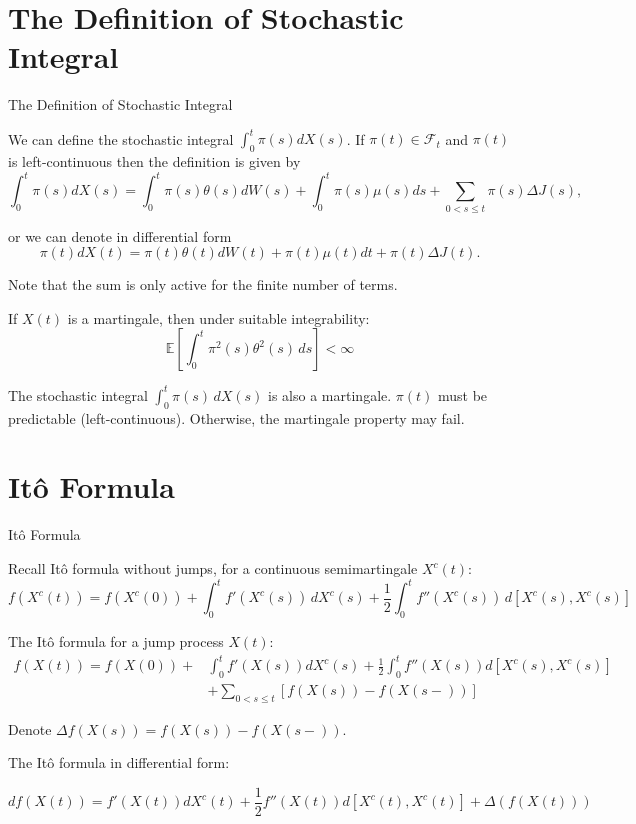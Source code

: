 \documentclass{beamer}
\begin{document}
\section{The Definition of Stochastic Integral}
\begin{frame}{The Definition of Stochastic Integral}

    {\footnotesize \footnotesize
    \par We can define the stochastic integral \(\int_0^t \pi(s) dX(s)\). If \(\pi(t) \in \mathcal{F}_t\) and \(\pi(t)\) is left-continuous then the definition is given by
    \[
    \int_0^t \pi(s) dX(s) = \int_0^t \pi(s) \theta(s) dW(s) + \int_0^t \pi(s) \mu(s) ds + \sum_{0 < s \leq t} \pi(s) \Delta J(s),
    \]
    \par or we can denote in differential form
    \[
    \pi(t) dX(t) = \pi(t) \theta(t) dW(t) + \pi(t) \mu(t) dt + \pi(t) \Delta J(t).
    \]

    \par Note that the sum is only active for the finite number of terms.
    \vspace{1em}
    \par If \( X(t) \) is a martingale, then under suitable integrability:
    \[
    \mathbb{E} \left[ \int_{0}^{t} \pi^2(s) \theta^2(s) \, ds \right] < \infty
    \]
    \par The stochastic integral \(\int_{0}^{t} \pi(s) \, dX(s)\) is also a martingale. \( \pi(t) \) 
    must be predictable (left-continuous). Otherwise, the martingale property may fail.

    }
    
\end{frame}

\section{Itô Formula}
 \begin{frame}{Itô Formula}

    {\footnotesize \footnotesize
    \par Recall Itô formula without jumps, for a continuous semimartingale \( X^c(t) \):
    \[
    f(X^c(t)) = f(X^c(0)) + \int_0^t f'(X^c(s)) \, dX^c(s) + \frac{1}{2} \int_0^t f''(X^c(s)) \, d[X^c(s), X^c(s)]
    \]
    \par The Itô formula for a jump process \( X(t) \):
    \begin{align*}
        f(X(t)) = f(X(0)) + &\int_{0}^{t} f'(X(s))dX^{c}(s) 
        + \frac{1}{2}\int_{0}^{t} f''(X(s))d[X^{c}(s), X^{c}(s)]\\
        & + \sum_{0<s\leq t}[f(X(s)) - f(X(s-))]
    \end{align*}
    \par Denote $\Delta f(X(s)) = f(X(s)) - f(X(s-))$.
    \vspace{1em}
    \par The Itô formula in differential form: 

    \[
    df(X(t)) = f'(X(t))dX^{c}(t) + \frac{1}{2}f''(X(t))d[X^{c}(t), X^{c}(t)] + \Delta(f(X(t)))
    \]
    }
    
\end{frame}
\end{document}
